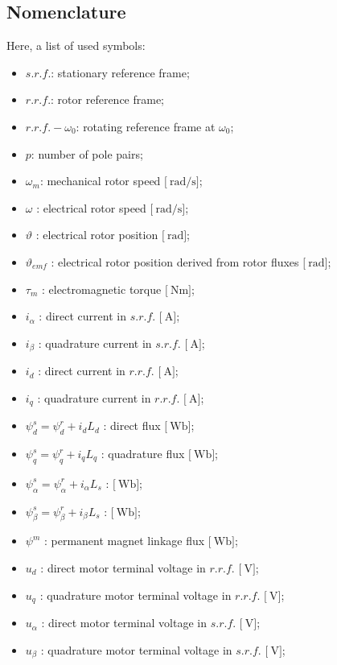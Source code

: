 \documentclass[11pt,a4paper]{article}
\numberwithin{equation}{section}
\theoremstyle{it}
\theoremstyle{definition}
\begin{document}
\begin{onehalfspace}
\subsection{Nomenclature}	
Here, a list of used symbols:
\begin{itemize}
	\item[--] $s.r.f.$: stationary reference frame;
	\item[--] $r.r.f.$: rotor reference frame;
	\item[--] $r.r.f.-\omega_0$: rotating reference frame at $\omega_0$;	
	\item[--] $p$: number of pole pairs;
	\item[--] $\omega_m$: mechanical rotor speed $\Big[\SI{}{\radian\per\second}\Big]$;
	\item[--] $\omega$ : electrical rotor speed $\Big[\SI{}{\radian\per\second}\Big]$;
	\item[--] $\vartheta$ : electrical rotor position $\Big[\SI{}{\radian}\Big]$;
	\item[--] $\vartheta_{emf}$ : electrical rotor position derived from rotor fluxes $\Big[\SI{}{\radian}\Big]$;
	\item[--] $\tau_m$ : electromagnetic torque $\Big[\SI{}{\newton\meter}\Big]$;
	\item[--] $i_\alpha$ : direct current in $s.r.f.$ $\Big[\SI{}{\ampere}\Big]$;
	\item[--] $i_\beta$ : quadrature current in $s.r.f.$ $\Big[\SI{}{\ampere}\Big]$;
	\item[--] $i_d$ : direct current in $r.r.f.$ $\Big[\SI{}{\ampere}\Big]$;
	\item[--] $i_q$ : quadrature current in $r.r.f.$ $\Big[\SI{}{\ampere}\Big]$;
	\item[--] $\psi_d^s=\psi_d^r+i_dL_d$ : direct flux $\Big[\SI{}{\weber}\Big]$;	
	\item[--] $\psi_q^s=\psi_q^r+i_qL_q$ : quadrature flux $\Big[\SI{}{\weber}\Big]$;	
	\item[--] $\psi_{\alpha}^s=\psi_{\alpha}^r+i_{\alpha}L_{s}$ : $\Big[\SI{}{\weber}\Big]$;	
	\item[--] $\psi_{\beta}^s=\psi_{\beta}^r+i_{\beta}L_{s}$ : $\Big[\SI{}{\weber}\Big]$;		
	\item[--] $\psi^m$ : permanent magnet linkage flux $\Big[\SI{}{\weber}\Big]$;		
	\item[--] $u_d$ : direct motor terminal voltage in $r.r.f.$ $\Big[\SI{}{\volt}\Big]$;
	\item[--] $u_q$ : quadrature motor terminal voltage in $r.r.f.$ $\Big[\SI{}{\volt}\Big]$;
	\item[--] $u_\alpha$ : direct motor terminal voltage in $s.r.f.$ $\Big[\SI{}{\volt}\Big]$;
	\item[--] $u_\beta$ : quadrature motor terminal voltage in $s.r.f.$ $\Big[\SI{}{\volt}\Big]$;
\end{itemize}


\end{onehalfspace}
\end{document}
